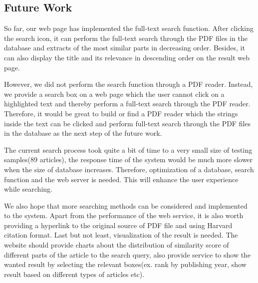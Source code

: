 
\subsection{Future Work}
So far, our web page has implemented the full-text search function. 
After clicking the search icon, it can perform the full-text search through the PDF files in the database and extracts of the most similar parts in decreasing order. 
Besides, it can also display the title and its relevance in descending order on the result web page.

However, we did not perform the search function through a PDF reader.
Instead, we provide a search box on a web page which the user cannot click on a highlighted text and thereby perform a full-text search through the PDF reader. 
Therefore, it would be great to build or find a PDF reader which the strings inside the text can be clicked and perform full-text search through the PDF files in the database as the next step of the future work.
 
The current search process took quite a bit of time to a very small size of testing samples(89 articles), the response time of the system would be much more slower when the size of database increases. 
Therefore, optimization of a database, search function and the web server is needed. 
This will enhance the user experience while searching.
 
We also hope that more searching methods can be considered and implemented to the system. 
Apart from the performance of the web service, it is also worth providing a hyperlink to the original source of PDF file and using Harvard citation format.
Last but not least, visualization of the result is needed. The website should provide charts about the distribution of similarity score of different parts of the article to the search query, also provide service to show the wanted result by selecting the relevant boxes(ex. rank by publishing year, show result based on different types of articles etc).